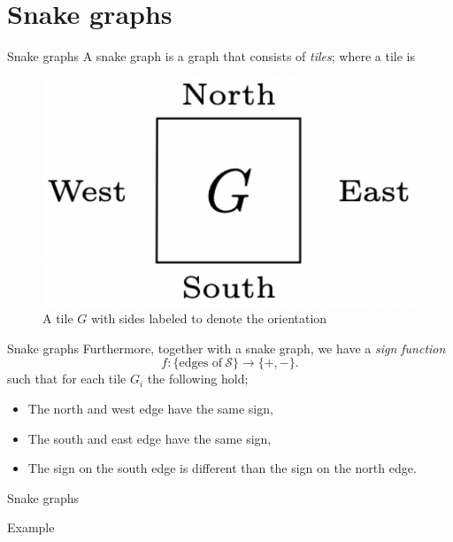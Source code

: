 \documentclass{beamer}
\begin{document}
\section{Snake graphs}

\begin{frame}{Snake graphs}
    A snake graph is a graph that consists of \emph{tiles}; where a tile is \pause
\begin{figure}[H]
    \centering
    \includegraphics[width = 2.5 cm]{Images/prestile.png}   
\caption{A tile $G$ with sides labeled to denote the orientation}
\end{figure}
\end{frame}

\begin{frame}{Snake graphs}
    Furthermore, together with a snake graph, we have a \emph{sign function}
    \begin{equation*}
    f: \{\text{edges of} \  \mathcal{S}\} \to \{+,-\}.
\end{equation*}
such that for each tile $G_i$ the following hold; \pause
\begin{itemize}
    \item The north and west edge have the same sign, \pause
    \item The south and east edge have the same sign, \pause
    \item The sign on the south edge is different than the sign on the north edge.
\end{itemize}
\end{frame}

\begin{frame}{Snake graphs}
\begin{exampleblock}{Example}
\centering
\end{exampleblock}
\end{frame}
\end{document}
